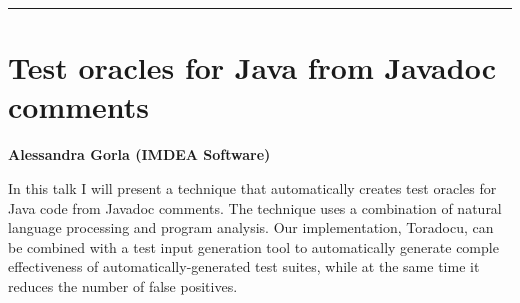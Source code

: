 \documentclass[11pt,pressrelease]{newlfm} %
\begin{document}
\begin{newlfm}
\rule{\textwidth}{1pt} \par \noindent
\section{Test oracles for Java from Javadoc comments}

{\bf Alessandra Gorla (IMDEA Software)}

In this talk I will present a technique that automatically creates test oracles for Java code from Javadoc comments. The technique uses a combination of natural language processing and program analysis. Our implementation, Toradocu, can be combined with a test input generation tool to automatically generate comple effectiveness of automatically-generated test suites, while at the same time it reduces the number of false positives.



\end{newlfm}
\end{document}
